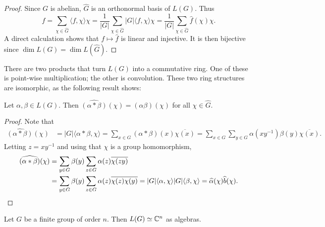 \begin{proof}
  Since $G$ is abelian, $\widehat{G}$ is an orthonormal basis of $L(G)$. Thus   
  \[
    f=\sum_{\chi\in\widehat{G}}\langle f,\chi\rangle\chi=\frac{1}{|G|}\sum_{\chi\in\widehat{G}}|G|\langle f,\chi\rangle \chi
    =\frac{1}{|G|}\sum_{\chi\in\widehat{G}}\widehat{f}(\chi)\chi.
  \]
  A direct calculation shows that $f\mapsto\widehat{f}$ is linear 
  and injective. It is then bijective since $\dim L(G)=\dim
  L(\widehat{G})$. 
\end{proof}

There are two products that turn $L(G)$ into a commutative ring. 
One of these is point-wise multiplication; the other is convolution.
These two ring structures are isomorphic, as the following result shows:

\begin{theorem}
  \label{thm:convolucion}
  Let $\alpha,\beta\in L(G)$. Then 
  $\widehat{(\alpha*\beta)}(\chi)=(\alpha\beta)(\chi)$ for all
  $\chi\in\widehat{G}$.
\end{theorem}

\begin{proof}
Note that 
\begin{align*}
  \widehat{(\alpha*\beta)}(\chi) &= |G|\langle \alpha*\beta,\chi\rangle 
  =\sum_{x\in G}(\alpha*\beta)(x)\overline{\chi(x)}
  =\sum_{x\in G}\sum_{y\in G}\alpha(xy^{-1})\beta(y)\overline{\chi(x)}.
\end{align*}
Letting $z=xy^{-1}$ and using that $\chi$ is a group homomorphism, 
\begin{align*}
  \widehat{(\alpha*\beta)}(\chi) &= \sum_{y\in G}\beta(y)\sum_{z\in G}\alpha(z)\overline{\chi(zy)}\\
  &=\sum_{y\in G}\beta(y)\sum_{z\in G}\alpha(z)\overline{\chi(z)}\overline{\chi(y)}
  =|G|\langle \alpha,\chi\rangle |G|\langle \beta,\chi\rangle
  =\widehat{\alpha}(\chi)\widehat{b}(\chi).\qedhere 
\end{align*}
\end{proof}

\begin{corollary}
  Let $G$ be a finite group of order $n$. 
  Then $L(G)\simeq\mathbb{C}^n$ as algebras. 
\end{corollary}

